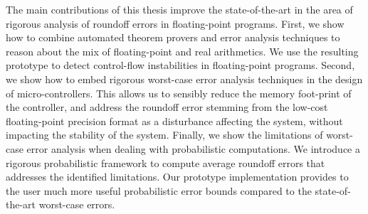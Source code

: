 The main contributions of this thesis improve the state-of-the-art in the area of rigorous analysis of roundoff errors in floating-point programs.
%
First, we show how to combine automated theorem provers and error analysis techniques to reason about the mix of floating-point and real arithmetics.
%
We use the resulting prototype to detect control-flow instabilities in floating-point programs.
%
Second, we show how to embed rigorous worst-case error analysis techniques in the design of micro-controllers.
%
This allows us to sensibly reduce the memory foot-print of the controller, and address the roundoff error stemming from the low-cost floating-point precision format as a disturbance affecting the system, without impacting the stability of the system.
%
Finally, we show the limitations of worst-case error analysis when dealing with probabilistic computations. 
%
We introduce a rigorous probabilistic framework to compute average roundoff errors that addresses the identified limitations.
%
Our prototype implementation provides to the user much more useful probabilistic error bounds compared to the state-of-the-art worst-case errors.
